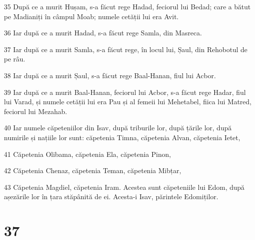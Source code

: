 \par 35 După ce a murit Hușam, s-a făcut rege Hadad, feciorul lui Bedad; care a bătut pe Madianiți în câmpul Moab; numele cetății lui era Avit.
\par 36 Iar după ce a murit Hadad, s-a făcut rege Samla, din Masreca.
\par 37 Iar după ce a murit Samla, s-a făcut rege, în locul lui, Șaul, din Rehobotul de pe râu.
\par 38 Iar după ce a murit Șaul, s-a făcut rege Baal-Hanan, fiul lui Acbor.
\par 39 Iar după ce a murit Baal-Hanan, feciorul lui Acbor, s-a făcut rege Hadar, fiul lui Varad, și numele cetății lui era Pau și al femeii lui Mehetabel, fiica lui Matred, feciorul lui Mezahab.
\par 40 Iar numele căpeteniilor din Isav, după triburile lor, după țările lor, după numirile și națiile lor sunt: căpetenia Timna, căpetenia Alvan, căpetenia Ietet,
\par 41 Căpetenia Olibama, căpetenia Ela, căpetenia Pinon,
\par 42 Căpetenia Chenaz, căpetenia Teman, căpetenia Mibțar,
\par 43 Căpetenia Magdiel, căpetenia Iram. Acestea sunt căpeteniile lui Edom, după așezările lor în țara stăpânită de ei. Acesta-i Isav, părintele Edomiților.

\chapter{37}

